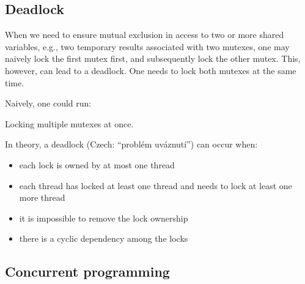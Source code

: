 \subsection{Deadlock}

When we need to ensure mutual exclusion in access to two or more shared variables, 
e.g., two temporary results associated with two mutexes, 
one may naively lock the first mutex first, and subsequently lock the other mutex. This, however, 
can lead to a deadlock. One needs to lock both mutexes at the same time.  

Naively, one could run:

\raggedbottom
\begin{codebox}[]{\href{https://godbolt.org/z/}{\ExternalLink}}
\footnotesize Locking multiple mutexes at once.
\tcblower
{}
\end{codebox}

In theory, a deadlock (Czech: ``problém uváznutí'') can occur when:
\begin{itemize}
\item each lock is owned by at most one thread
\item each thread has locked at least one thread and needs to lock at least one more thread
\item it is impossible to remove the lock ownership
\item there is a cyclic dependency among the locks
\end{itemize}

\subsection{Concurrent programming}

